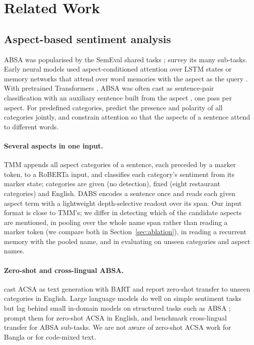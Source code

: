 \documentclass[11pt]{article}
\begin{document}
\section{Related Work}
\label{sec:related}

\subsection{Aspect-based sentiment analysis}
ABSA was popularised by the SemEval shared tasks \citep{pontiki2014semeval,pontiki2016semeval};
\citet{zhang2023absasurvey} survey its many sub-tasks. Early neural models used aspect-conditioned
attention over LSTM states \citep{wang2016atae} or memory networks that attend over word memories
with the aspect as the query \citep{tang2016memnet}. With pretrained Transformers
\citep{vaswani2017attention,devlin2019bert}, ABSA was often cast as sentence-pair classification with
an auxiliary sentence built from the aspect \citep{sun2019auxiliary}, one pass per aspect. For
predefined categories, \citet{schmitt2018joint} predict the presence and polarity of all categories
jointly, and \citet{hu2019can} constrain attention so that the aspects of a sentence attend to
different words.

\paragraph{Several aspects in one input.} TMM \citep{wu2020tmm} appends all aspect categories of a
sentence, each preceded by a marker token, to a RoBERTa input, and classifies each category's
sentiment from its marker state; categories are given (no detection), fixed (eight restaurant
categories) and English. DABS \citep{xia2026dabs} encodes a sentence once and reads each given aspect
term with a lightweight depth-selective readout over its span. Our input format is close to TMM's;
we differ in detecting which of the candidate aspects are mentioned, in pooling over the whole name
span rather than reading a marker token (we compare both in Section~\ref{sec:ablation}), in reading a
recurrent memory with the pooled name, and in evaluating on unseen categories and aspect names.

\paragraph{Zero-shot and cross-lingual ABSA.} \citet{liu2021acsagen} cast ACSA as text generation
with BART and report zero-shot transfer to unseen categories in English. Large language models do well
on simple sentiment tasks but lag behind small in-domain models on structured tasks such as ABSA
\citep{zhang2024llmsentiment}; \citet{ventirozos2025zeroshotacsa} prompt them for zero-shot ACSA in
English, and \citet{fehle2026crosslingual} benchmark cross-lingual transfer for ABSA sub-tasks. We are
not aware of zero-shot ACSA work for Bangla or for code-mixed text.
\end{document}
